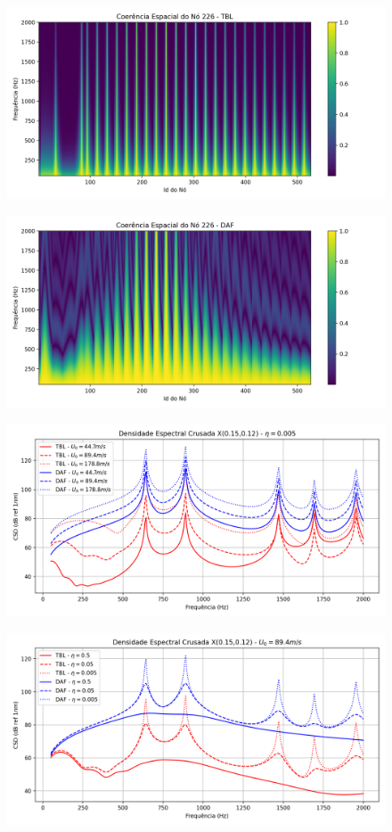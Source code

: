 \documentclass[9pt,a4paper,twoside]{rho-class/rho}
\begin{document}
\begin{figure}[H]
	\centering
	\includegraphics[width=0.9\columnwidth]{figures/coer_TBL.png}
	\caption{}
	\label{fig:coerTBL}
\end{figure}

\begin{figure}[H]
	\centering
	\includegraphics[width=0.9\columnwidth]{figures/coer_DAF.png}
	\caption{}
	\label{fig:coerDAF}
\end{figure}




\begin{figure}[H]
	\centering
	\includegraphics[width=0.9\columnwidth]{figures/csd_vel.png}
	\caption{}
	\label{fig:csdvel}
\end{figure}

\begin{figure}[H]
	\centering
	\includegraphics[width=0.9\columnwidth]{figures/csd_eta.png}
	\caption{}
	\label{fig:csdeta}
\end{figure}



\printbibliography

\end{document}
